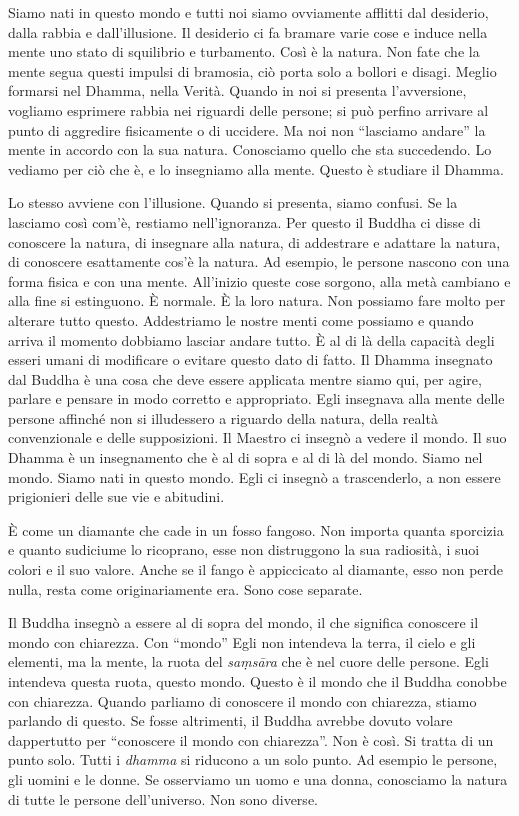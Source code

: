 Siamo nati in questo mondo e tutti noi siamo ovviamente afflitti dal
desiderio, dalla rabbia e dall'illusione. Il desiderio ci fa bramare
varie cose e induce nella mente uno stato di squilibrio e turbamento.
Così è la natura. Non fate che la mente segua questi impulsi di
bramosia, ciò porta solo a bollori e disagi. Meglio formarsi nel Dhamma,
nella Verità. Quando in noi si presenta l'avversione, vogliamo esprimere
rabbia nei riguardi delle persone; si può perfino arrivare al punto di
aggredire fisicamente o di uccidere. Ma noi non ``lasciamo andare'' la
mente in accordo con la sua natura. Conosciamo quello che sta
succedendo. Lo vediamo per ciò che è, e lo insegniamo alla mente. Questo
è studiare il Dhamma.

Lo stesso avviene con l'illusione. Quando si presenta, siamo confusi. Se
la lasciamo così com'è, restiamo nell'ignoranza. Per questo il Buddha ci
disse di conoscere la natura, di insegnare alla natura, di addestrare e
adattare la natura, di conoscere esattamente cos'è la natura. Ad
esempio, le persone nascono con una forma fisica e con una mente.
All'inizio queste cose sorgono, alla metà cambiano e alla fine si
estinguono. È normale. È la loro natura. Non possiamo fare molto per
alterare tutto questo. Addestriamo le nostre menti come possiamo e
quando arriva il momento dobbiamo lasciar andare tutto. È al di là della
capacità degli esseri umani di modificare o evitare questo dato di
fatto. Il Dhamma insegnato dal Buddha è una cosa che deve essere
applicata mentre siamo qui, per agire, parlare e pensare in modo
corretto e appropriato. Egli insegnava alla mente delle persone affinché
non si illudessero a riguardo della natura, della realtà convenzionale e
delle supposizioni. Il Maestro ci insegnò a vedere il mondo. Il suo
Dhamma è un insegnamento che è al di sopra e al di là del mondo. Siamo
nel mondo. Siamo nati in questo mondo. Egli ci insegnò a trascenderlo, a
non essere prigionieri delle sue vie e abitudini.

È come un diamante che cade in un fosso fangoso. Non importa quanta
sporcizia e quanto sudiciume lo ricoprano, esse non distruggono la sua
radiosità, i suoi colori e il suo valore. Anche se il fango è
appiccicato al diamante, esso non perde nulla, resta come
originariamente era. Sono cose separate.

Il Buddha insegnò a essere al di sopra del mondo, il che significa
conoscere il mondo con chiarezza. Con ``mondo'' Egli non intendeva la
terra, il cielo e gli elementi, ma la mente, la ruota del \emph{saṃsāra}
che è nel cuore delle persone. Egli intendeva questa ruota, questo
mondo. Questo è il mondo che il Buddha conobbe con chiarezza. Quando
parliamo di conoscere il mondo con chiarezza, stiamo parlando di questo.
Se fosse altrimenti, il Buddha avrebbe dovuto volare dappertutto per
``conoscere il mondo con chiarezza''. Non è così. Si tratta di un punto
solo. Tutti i \emph{dhamma} si riducono a un solo punto. Ad esempio le
persone, gli uomini e le donne. Se osserviamo un uomo e una donna,
conosciamo la natura di tutte le persone dell'universo. Non sono
diverse.

